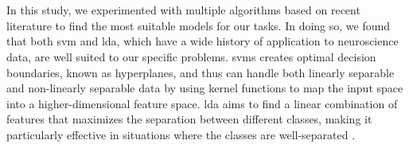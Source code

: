 \\
\\
In this study, we experimented with multiple algorithms based on recent literature to find the most suitable models for our tasks. In doing so, we found that both \gls{svm} and \gls{lda}, which have a wide history of application to neuroscience data, are well suited to our specific problems. 
\Glspl{svm} creates optimal decision boundaries, known as hyperplanes, and thus can handle both linearly separable and non-linearly separable data by using kernel functions to map the input space into a higher-dimensional feature space. \Gls{lda} aims to find a linear combination of features that maximizes the separation between different classes, making it particularly effective in situations where the classes are well-separated \cite{shoorangiz2021eeg}. 



